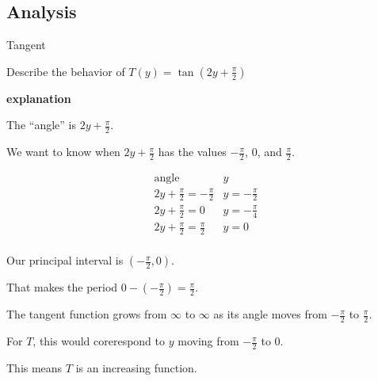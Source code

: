 \documentclass{ximera}
\begin{document}
\subsection*{Analysis}



















\begin{example} Tangent

Describe the behavior of   $T(y) = \tan\left( 2 y + \frac{\pi}{2} \right)$



\textbf{\textcolor{red!75!green}{explanation}} 



The ``angle'' is $2 y + \frac{\pi}{2}$.

We want to know when $2 y + \frac{\pi}{2}$ has the values $-\frac{\pi}{2}$, $0$, and $\frac{\pi}{2}$.






\[
\begin{array}{l|l}
\text{angle}                          & y  \\ \hline
2 y + \frac{\pi}{2} = -\frac{\pi}{2}        & y = -\frac{\pi}{2}  \\
2 y + \frac{\pi}{2} = 0               &  y = -\frac{\pi}{4} \\
2 y + \frac{\pi}{2} = \frac{\pi}{2}   & y = 0  \\
\end{array}
\]






Our principal interval is $\left( -\frac{\pi}{2}, 0 \right)$.

That makes the period $0 - \left( -\frac{\pi}{2} \right) = \frac{\pi}{2}$.




The tangent function grows from $\infty$ to $\infty$ as its angle moves from $-\frac{\pi}{2}$ to $\frac{\pi}{2}$.

For $T$, this would corerespond to $y$ moving from $-\frac{\pi}{2}$ to $0$.

This means $T$ is an increasing function.




\end{example}
\end{document}
